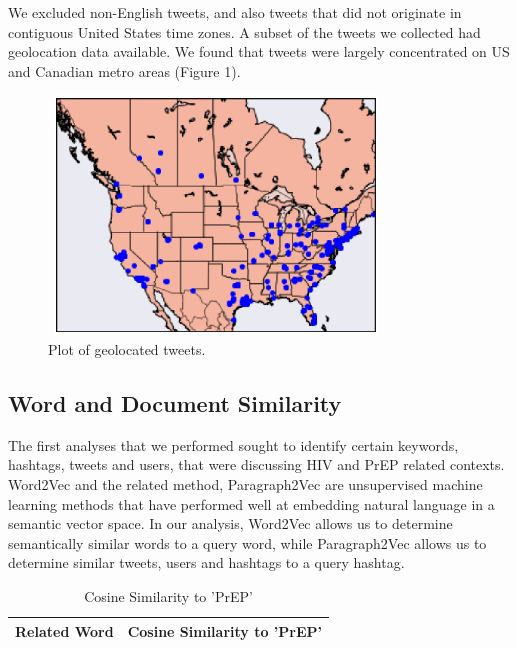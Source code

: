 \documentclass{sig-alternate-05-2015}
\begin{document}
We excluded non-English tweets, and also tweets that did not originate in contiguous United States time zones. A subset of the tweets we collected had geolocation data available. We found that tweets were largely concentrated on US and Canadian metro areas (Figure 1).


\begin{figure}
\centering
\includegraphics[height=2.5in, width=3.5in]{map}
\caption{Plot of geolocated tweets.}
\end{figure}

\subsection{Word and Document Similarity}


The first analyses that we performed sought to identify certain keywords, hashtags, tweets and users, that were discussing HIV and PrEP related contexts. Word2Vec and the related method, Paragraph2Vec are unsupervised machine learning methods that have performed well at embedding natural language in a semantic vector space. In our analysis, Word2Vec allows us to determine semantically similar words to a query word, while Paragraph2Vec allows us to determine similar tweets, users and hashtags to a query hashtag.


\begin{table}
\centering
\caption{Cosine Similarity to 'PrEP'}
\begin{tabular}{|l|c|} \hline
Related Word & Cosine Similarity to 'PrEP'\\ \hline
\hline\end{tabular}
\end{table}
\end{document}

